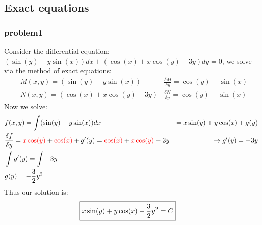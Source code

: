 \documentclass{article}
\begin{document}
\pagestyle{fancy}

\setcounter{section}{2}
\setcounter{subsection}{3}
\setcounter{subsubsection}{0}

\subsection{Exact equations}
\subsubsection{problem1}


Consider the differential equation: $(\sin(y) - y\sin(x))dx + (\cos(x) + x\cos(y) - 3y)dy = 0$, we solve via the method of exact equations:
\begin{align*}
    & M(x,y) = (\sin(y) - y\sin(x)) & \frac{\delta M}{\delta y} = \cos(y) - \sin(x)\\
    & N(x,y) = (\cos(x) + x\cos(y) - 3y) & \frac{\delta N}{\delta y} = \cos(y) - \sin(x)
\end{align*}
Now we solve:
\begin{align}
    & f(x,y) = \int(\sin(y) - y\sin(x))dx & = x\sin(y) + y\cos(x) + g(y)\\
     &\frac{\delta f}{\delta y} = \textcolor{red}{x\cos(y)} + \textcolor{red}{\cos(x)} + g'(y) =
     \textcolor{red}{\cos(x)} + \textcolor{red}{x\cos(y)} - 3y & \rightarrow  g'(y) = -3y\\
     & \int g'(y) = \int -3y \\
     & g(y) = -\frac{3}{2}y^2
\end{align}
Thus our solution is:
\begin{align}
     \Aboxed{x\sin(y) + y\cos(x) - \frac{3}{2}y^2 = C}
\end{align}


\setcounter{equation}{0}
\end{document}
